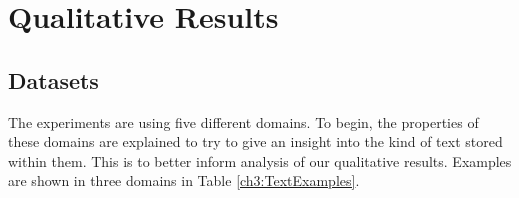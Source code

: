 

\section{Qualitative Results}

\subsection{Datasets}\label{ch3:datasets}

The experiments are using five different domains. To begin, the properties of these domains are explained to try to give an insight into the kind of text stored within them. This is to better inform analysis of our qualitative results. Examples are shown in three domains in Table \ref{ch3:TextExamples}.

